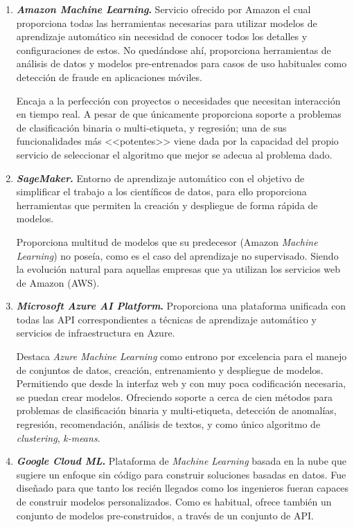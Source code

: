 \begin{enumerate}
\item \textbf{\textit{Amazon Machine Learning}.}
Servicio ofrecido por Amazon el cual proporciona todas las herramientas necesarias para utilizar modelos de aprendizaje automático sin necesidad de conocer todos los detalles y configuraciones de estos. No quedándose ahí, proporciona herramientas de análisis de datos y modelos pre-entrenados para casos de uso habituales como detección de fraude en aplicaciones móviles.

Encaja a la perfección con proyectos o necesidades que necesitan interacción en tiempo real. A pesar de que únicamente proporciona soporte a problemas de clasificación binaria o multi-etiqueta, y regresión; una de sus funcionalidades más <<potentes>> viene dada por la capacidad del propio servicio de seleccionar el algoritmo que mejor se adecua al problema dado.

\item \textbf{\textit{SageMaker}.}
Entorno de aprendizaje automático con el objetivo de simplificar el trabajo a los científicos de datos, para ello proporciona herramientas que permiten la creación y despliegue de forma rápida de modelos.

Proporciona multitud de modelos que su predecesor (Amazon \textit{Machine Learning}) no poseía, como es el caso del aprendizaje no supervisado. Siendo la evolución natural para aquellas empresas que ya utilizan los servicios web de Amazon (AWS).

\item \textbf{\textit{Microsoft Azure AI Platform}.}
Proporciona una plataforma unificada con todas las API correspondientes a técnicas de aprendizaje automático y servicios de infraestructura en Azure.

Destaca \textit{Azure Machine Learning} como entrono por excelencia para el manejo de conjuntos de datos, creación, entrenamiento y despliegue de modelos. Permitiendo que desde la interfaz web y con muy poca codificación necesaria, se puedan crear modelos. Ofreciendo soporte a cerca de cien métodos para problemas de clasificación binaria y multi-etiqueta, detección de anomalías, regresión, recomendación, análisis de textos, y como único algoritmo de \textit{clustering}, \textit{k-means}.

\item \textbf{\textit{Google Cloud ML}.}
Plataforma de \textit{Machine Learning} basada en la nube que sugiere un enfoque sin código para construir soluciones basadas en datos. Fue diseñado para que tanto los recién llegados como los ingenieros fueran capaces de construir modelos personalizados. Como es habitual, ofrece también un conjunto de modelos pre-construidos, a través de un conjunto de API.


\end{enumerate}
